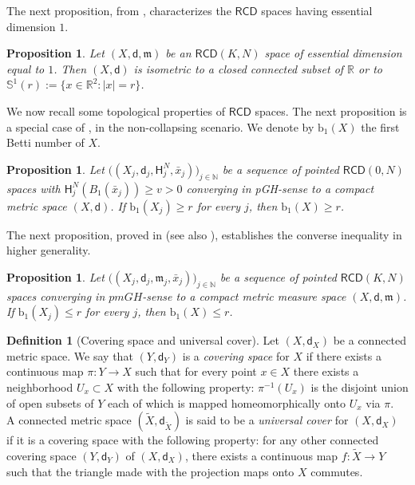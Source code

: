 \documentclass[10pt]{article}
\newtheorem{proposition}[thm]{Proposition}
\theoremstyle{definition}
\newtheorem{definition}[thm]{Definition}
\newcommand{\bb}[1]{\mathbb{#1}}
\newcommand{\RCD}{\mathsf{RCD}}
\newcommand{\aH}{\mathsf{H}}
\newcommand{\sd}{\mathsf{d}}
\newcommand{\m}{\mathfrak{m}}
\begin{document}
The next proposition, from \cite[Theorem $1.1$]{KL}, characterizes the $\RCD$ spaces having essential dimension  $1$.

\begin{proposition} \label{P1}
    Let $(X,\sd,\m)$ be an $\RCD(K,N)$ space of essential dimension equal to $1$. Then $(X, \sd)$ is isometric to a closed connected subset of $\bb{R}$ or to $\mathbb{S}^1(r):=\{x \in \bb{R}^2: |x|=r \}$.
\end{proposition}

We now recall some topological properties of $\RCD$ spaces.
The next proposition is a special case of  \cite[Theorem 5]{Santos}, in the non-collapsing scenario.  We denote by $\mathrm{b}_1(X)$ the first Betti number of $X$.

\begin{proposition} \label{P|uppersemicontinuity betti}
    Let $\big((X_j,\sd_j,\aH^N_j,\bar{x}_j)\big)_{j\in \mathbb{N}}$ be a sequence of pointed  $\RCD(0,N)$ spaces with $\aH^N_j(B_1(\bar{x}_j)) \geq v>0$ converging in pGH-sense to a compact metric space $(X,\sd)$. If $\mathrm{b}_1(X_j) \geq r$ for every $j$, then $\mathrm{b}_1(X) \geq r$. 
\end{proposition}

The next proposition, proved in \cite[Corollary 1.2]{RCDsemilocally} (see also \cite[Theorem 1.2]{wang2021riccilimitspacessemilocally}), establishes the converse inequality in higher generality.

\begin{proposition} \label{P|lowerbetti}
    Let $\big((X_j,\sd_j,\m_j, \bar{x}_j)\big)_{j\in \mathbb{N}}$ be a sequence of pointed $\RCD(K,N)$ spaces converging in $pmGH$-sense to a compact metric measure space $(X,\sd,\m)$. If $\mathrm{b}_1(X_j) \leq r$ for every $j$, then $\mathrm{b}_1(X) \leq r$. 
\end{proposition}

\begin{definition}[Covering space and universal cover] Let $(X, \sd_X )$ be a connected metric space. We say that $(Y, \sd_Y )$ is a \emph{covering space} for $X$ if there exists a continuous map $\pi : Y \to X$
such that for every point $x \in X$ there exists a neighborhood $U_x \subset X$ with the following property:
$\pi^{-1}(U_x)$ is the disjoint union of open subsets of $Y$ each of which is mapped homeomorphically onto
$U_x$ via $\pi$. \\
A connected metric space $(\tilde{X},\sd_{\tilde{X}})$ is said to be a \emph{universal cover} for $(X,\sd_X)$ if it is
a covering space  with the following property: for any other connected covering space $(Y, \sd_Y )$ of
$(X,\sd_X)$, there exists a continuous map $f : \tilde{X} \to Y$ such that the triangle made with the projection
maps onto $X$ commutes. 
\end{definition}
\end{document}
